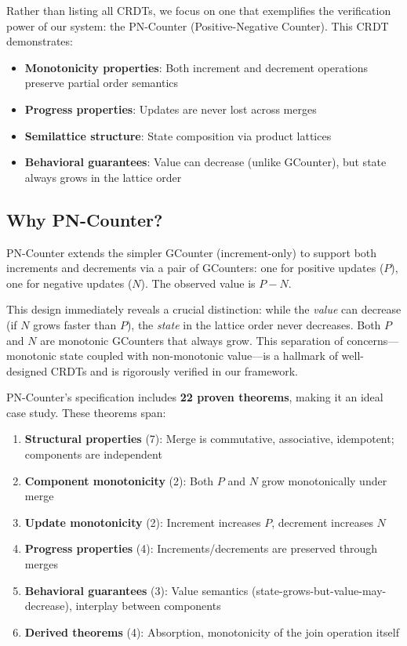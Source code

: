 Rather than listing all CRDTs, we focus on one that exemplifies the verification power of our system: the PN-Counter (Positive-Negative Counter). This CRDT demonstrates:

\begin{itemize}
  \item \textbf{Monotonicity properties}: Both increment and decrement operations preserve partial order semantics
  \item \textbf{Progress properties}: Updates are never lost across merges
  \item \textbf{Semilattice structure}: State composition via product lattices
  \item \textbf{Behavioral guarantees}: Value can decrease (unlike GCounter), but state always grows in the lattice order
\end{itemize}

\subsection{Why PN-Counter?}

PN-Counter extends the simpler GCounter (increment-only) to support both increments and decrements via a pair of GCounters: one for positive updates ($P$), one for negative updates ($N$). The observed value is $P - N$. 

This design immediately reveals a crucial distinction: while the \emph{value} can decrease (if $N$ grows faster than $P$), the \emph{state} in the lattice order never decreases. Both $P$ and $N$ are monotonic GCounters that always grow. This separation of concerns—monotonic state coupled with non-monotonic value—is a hallmark of well-designed CRDTs and is rigorously verified in our framework.

PN-Counter's specification includes \textbf{22 proven theorems}, making it an ideal case study. These theorems span:

\begin{enumerate}
  \item \textbf{Structural properties} (7): Merge is commutative, associative, idempotent; components are independent
  \item \textbf{Component monotonicity} (2): Both $P$ and $N$ grow monotonically under merge
  \item \textbf{Update monotonicity} (2): Increment increases $P$, decrement increases $N$
  \item \textbf{Progress properties} (4): Increments/decrements are preserved through merges
  \item \textbf{Behavioral guarantees} (3): Value semantics (state-grows-but-value-may-decrease), interplay between components
  \item \textbf{Derived theorems} (4): Absorption, monotonicity of the join operation itself
\end{enumerate}

